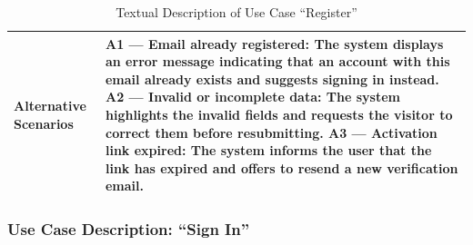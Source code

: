 \begin{table}[H]
\begin{tabularx}{\textwidth}{|>{\bfseries\arraybackslash}p{2cm}|X|}
\hline
Alternative Scenarios &
\textbf{A1 --- Email already registered:} The system displays an error message indicating that an account with this email already exists and suggests signing in instead. \newline
\textbf{A2 --- Invalid or incomplete data:} The system highlights the invalid fields and requests the visitor to correct them before resubmitting. \newline
\textbf{A3 --- Activation link expired:} The system informs the user that the link has expired and offers to resend a new verification email. \\
\hline
\end{tabularx}
\caption{Textual Description of Use Case ``Register''}
\label{tab:uc-register}
\end{table}
\normalsize
\setlength{\tabcolsep}{6pt}
\renewcommand{\arraystretch}{1}

\subsubsection{Use Case Description: ``Sign In''}

